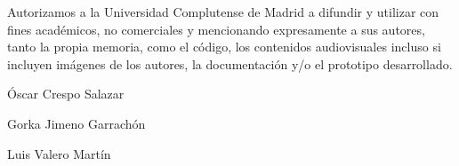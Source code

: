 \noindent Autorizamos a la Universidad Complutense de Madrid a difundir y utilizar con fines acad\'emicos, no comerciales y mencionando expresamente a sus autores, tanto la propia memoria, como el c\'odigo, los contenidos audiovisuales incluso si incluyen im\'agenes de los autores, la documentaci\'on y/o el prototipo desarrollado.\\

\vspace*{4cm}\par

\'Oscar Crespo Salazar 

\vspace*{4cm}\par 

Gorka Jimeno Garrach\'on

\vspace*{4cm}\par 

Luis Valero Mart\'in
